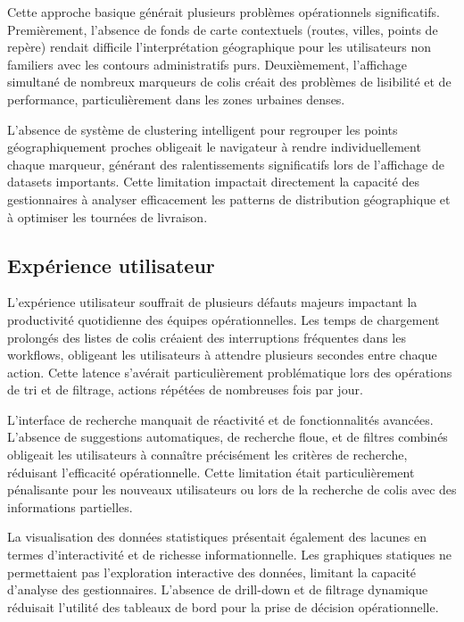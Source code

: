 Cette approche basique générait plusieurs problèmes opérationnels significatifs. Premièrement, l'absence de fonds de carte contextuels (routes, villes, points de repère) rendait difficile l'interprétation géographique pour les utilisateurs non familiers avec les contours administratifs purs. Deuxièmement, l'affichage simultané de nombreux marqueurs de colis créait des problèmes de lisibilité et de performance, particulièrement dans les zones urbaines denses.

L'absence de système de clustering intelligent pour regrouper les points géographiquement proches obligeait le navigateur à rendre individuellement chaque marqueur, générant des ralentissements significatifs lors de l'affichage de datasets importants. Cette limitation impactait directement la capacité des gestionnaires à analyser efficacement les patterns de distribution géographique et à optimiser les tournées de livraison.

\subsection{Expérience utilisateur}

L'expérience utilisateur souffrait de plusieurs défauts majeurs impactant la productivité quotidienne des équipes opérationnelles. Les temps de chargement prolongés des listes de colis créaient des interruptions fréquentes dans les workflows, obligeant les utilisateurs à attendre plusieurs secondes entre chaque action. Cette latence s'avérait particulièrement problématique lors des opérations de tri et de filtrage, actions répétées de nombreuses fois par jour.

L'interface de recherche manquait de réactivité et de fonctionnalités avancées. L'absence de suggestions automatiques, de recherche floue, et de filtres combinés obligeait les utilisateurs à connaître précisément les critères de recherche, réduisant l'efficacité opérationnelle. Cette limitation était particulièrement pénalisante pour les nouveaux utilisateurs ou lors de la recherche de colis avec des informations partielles.

La visualisation des données statistiques présentait également des lacunes en termes d'interactivité et de richesse informationnelle. Les graphiques statiques ne permettaient pas l'exploration interactive des données, limitant la capacité d'analyse des gestionnaires. L'absence de drill-down et de filtrage dynamique réduisait l'utilité des tableaux de bord pour la prise de décision opérationnelle.

